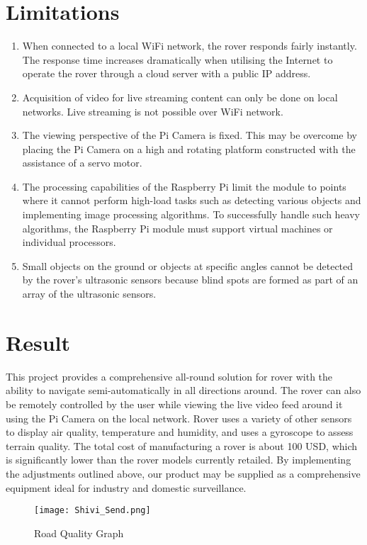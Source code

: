 \documentclass[conference,a4paper]{IEEEtran}
\begin{document}
\section{Limitations}
\begin{enumerate}
        \item When connected to a local WiFi network, the rover responds fairly instantly. The response time increases dramatically when utilising the Internet to operate the rover through a cloud server with a public IP address.
        \item Acquisition of video for live streaming content can only be done on local networks. Live streaming is not possible over WiFi network.
        \item The viewing perspective of the Pi Camera is fixed. This may be overcome by placing the Pi Camera on a high and rotating platform constructed with the assistance of a servo motor.
        \item The processing capabilities of the Raspberry Pi limit the module to points where it cannot perform high-load tasks such as detecting various objects and implementing image processing algorithms. To successfully handle such heavy algorithms, the Raspberry Pi module must support virtual machines or individual processors.
        \item Small objects on the ground or objects at specific angles cannot be detected by the rover's ultrasonic sensors because blind spots are formed as part of an array of the ultrasonic sensors.
\end{enumerate}

\section{Result}
This project provides a comprehensive all-round solution for  rover with the ability to navigate semi-automatically in all directions around. The rover can also be remotely controlled by the user while viewing the live video feed around it using the Pi Camera on the local network. Rover uses a variety of other sensors to display air quality, temperature and humidity, and uses a gyroscope to assess terrain quality. The total cost of manufacturing a rover is about 100 USD, which is significantly lower than the rover models currently retailed. By implementing the adjustments outlined above, our product may be supplied as a comprehensive equipment ideal for industry and domestic surveillance.

\begin{figure}[ht]
\centering
\texttt{[image: Shivi\_Send.png]}
\caption{Road Quality Graph}
\label{Fig: Road Quality}
\end{figure}
\end{document}
